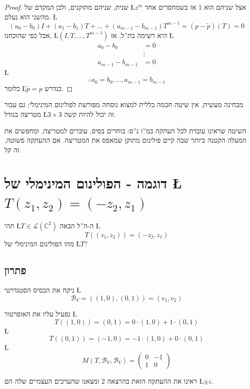 \documentclass[english,hebrew]{article}
\begin{document}
\begin{proof}
שנית, שניהם מתוקנים, ולכן המקדם של \L{$z^{m}$} אצל שניהם הוא 1 אז
כשמחסרים אחד מהשני הוא נעלם. \L{%
\[
\left(a_{0}-b_{0}\right)I+\left(a_{1}-b_{1}\right)T+\dots+\left(a_{m-1}-b_{m-1}\right)T^{m-1}=\left(p-\widetilde{p}\right)\left(T\right)=0
\]
}%
אבל כפי שהוכחנו, \L{$\left(I,T,\ldots,T^{m-1}\right)$} היא רשימה
בת\textquotedblright ל, אז \L{%
\begin{align*}
a_{0}-b_{0} & =0\\
 & \vdots\\
a_{m-1}-b_{m-1} & =0
\end{align*}
}%
\L{%
\[
\therefore a_{0}=b_{0},\dots,a_{m-1}=b_{m-1}
\]
}%
כלומר \L{$\widetilde{p}=p$} כנדרש. 
\end{proof}
מבחינה מעשית, אין שיטה חכמה כללית למצוא נוסחה מפורשת לפולינום המינימלי;
גם עבור מטריצה בגודל \L{$3\times3$} זה יכול להיות קשה.

השיטה שראינו עובדת לכל העתקה במ\textquotedblright ו נ\textquotedblright ס:
בוחרים בסיס, עוברים למטריצה, ומחפשים את המעלה הקטנה ביותר שבה קיים
פולינום מתוקן שמאפס את המטריצה. אם ההעתקה פשוטה, זה קל.

\section{דוגמה - הפולינום המינימלי של \L{$T\left(z_{1},z_{2}\right)=\left(-z_{2},z_{1}\right)$}}

תהי \L{$T\in\mathcal{L}\left(\mathbb{C}^{2}\right)$} ה-ה\textquotedblright ל
הבאה \L{%
\[
T\left(\left(z_{1},z_{2}\right)\right)=\left(-z_{2},z_{1}\right)
\]
}%
מהו הפולינום המינימלי של \L{$T$}?

\subsection{פתרון}

ניקח את הבסיס הסטנדרטי \L{%
\[
\mathcal{B}_{V}=\left(\left(1,0\right),\left(0,1\right)\right)=\left(v_{1},v_{2}\right)
\]
}%

נפעיל עליו את האופרטור \L{%
\[
T\left(\left(1,0\right)\right)=\left(0,1\right)=0\cdot\left(1,0\right)+1\cdot\left(0,1\right)
\]
}%
\L{%
\[
T\left(\left(0,1\right)\right)=\left(-1,0\right)=-1\cdot\left(1,0\right)+0\cdot\left(0,1\right)
\]
}%
\L{%
\[
M\left(T,\mathcal{B}_{V},\mathcal{B}_{V}\right)=\begin{pmatrix}0 & -1\\
1 & 0
\end{pmatrix}
\]
}%

ראינו את ההעתקה הזאת בהרצאה 2 ומצאנו שהערכים העצמיים שלה הם \L{$\pm i$}.
\end{document}
